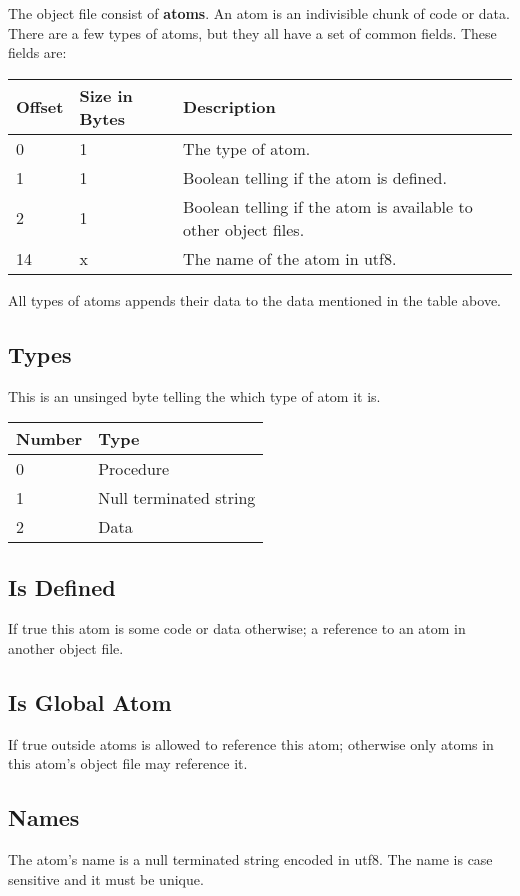 The object file consist of \textbf{atoms}. An atom is an indivisible chunk of
code or data. There are a few types of atoms, but they all have a set of common
fields. These fields are:

\begin{table}[h]
    \centering
    \label{tbl:atom}
    \begin{tabular}{|l|l|l|}
        \hline
        \textbf{Offset} & \textbf{Size in Bytes} & \textbf{Description}                                            \\ \hline
        0               & 1                      & The type of atom.                                               \\ \hline
        1               & 1                      & Boolean telling if the atom is defined.                         \\ \hline
        2               & 1                      & Boolean telling if the atom is available to other object files. \\ \hline
        14              & x                      & The name of the atom in utf8.                                   \\ \hline
    \end{tabular}
\end{table}

All types of atoms appends their data to the data mentioned in the table above.

\subsection{Types}
This is an unsinged byte telling the which type of atom it is.

\begin{table}[h]
    \centering
    \label{tbl:type}
    \begin{tabular}{|l|l|}
        \hline
        \textbf{Number} & \textbf{Type}          \\ \hline
        0               & Procedure              \\ \hline
        1               & Null terminated string \\ \hline
        2               & Data                   \\ \hline
    \end{tabular}
\end{table}

\subsection{Is Defined}
If true this atom is some code or data otherwise; a reference to an atom in 
another object file.

\subsection{Is Global Atom}
If true outside atoms is allowed to reference this atom; otherwise only atoms in
this atom's object file may reference it.

\subsection{Names}
The atom's name is a null terminated string encoded in utf8. The name is case 
sensitive and it must be unique.